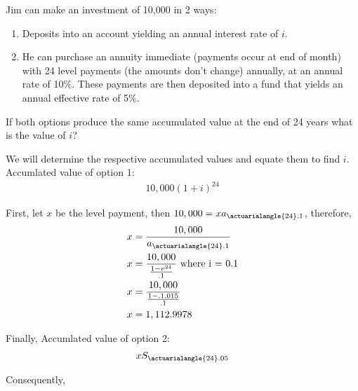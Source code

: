 \documentclass[12pt]{article}
\newenvironment{question}[2][Question]{\begin{trivlist}
\item[\hskip \labelsep {\bfseries #1}\hskip \labelsep {\bfseries #2.}]}{\end{trivlist}}
\begin{document}
\begin{question}[Question 2.2.7]
\hline

\begin{question}[Problem 2.2.13] 
a Jim can make an investment of 10,000 in 2 ways:\\  
\begin{enumerate}  
\item Deposits into an account yielding an annual interest rate of $i$.
\item He can purchase an annuity immediate (payments occur at end of month) with
24 level payments (the amounts don't change) annually, at an
annual rate of 10\%. These payments are then deposited into
a fund that yields an annual effective rate of 5\%.   
\end{enumerate}
If both options produce the same accumulated value at the end of 24 years
what is the value of $i$? 
\end{question}

We will determine the respective accumulated values and equate them to find $i$.\\

Accumlated value of option 1:\\
\begin{align*}
	10,000 \left(1+i \right)^{24} 
\end{align*}

First, let $x$ be the level payment, then $10,000 = xa_{\actuarialangle{24}.1}$, therefore,\\
\begin{align*}
	x &= \frac{10,000}{a_{\actuarialangle{24}.1}}\\
	x &= \frac{10,000}{\frac{1-v^{24}}{.1}} \text{ where i = 0.1}\\
	x &= \frac{10,000}{\frac{1-.1.015}{.1}}\\
	x &= 1,112.9978\\
\end{align*}

Finally, Accumlated value of option 2:\\
\begin{align*}
	xS_{\actuarialangle{24}.05}
\end{align*}

Consequently,\\


\end{question}
\end{document}
